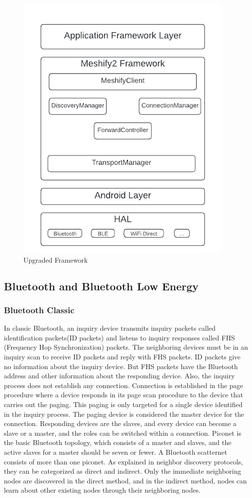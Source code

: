\begin{figure}[htbp]
    \centerline{\includegraphics[height=0.45\textwidth]{imgs/classArch.png}}
    \caption{Upgraded Framework}
    \label{figArch}
\end{figure}

\subsection{Bluetooth and Bluetooth Low Energy}

\subsubsection{Bluetooth Classic}

In classic Bluetooth, an inquiry device transmits inquiry packets called
identification packets(ID packets) and listens to inquiry responses called FHS
(Frequency Hop Synchronization) packets. The neighboring devices must be in an
inquiry scan to receive ID packets and reply with FHS packets. ID packets give
no information about the inquiry device. But FHS packets have the Bluetooth
address and other information about the responding device. Also, the inquiry
process does not establish any connection. Connection is established in the
page procedure where a device responds in its page scan procedure to the device
that carries out the paging. This paging is only targeted for a single device
identified in the inquiry process. The paging device is considered the master
device for the connection. Responding devices are the slaves, and every device
can become a slave or a master, and the roles can be switched within a
connection. Piconet is the basic Bluetooth topology, which consists of a master
and slaves, and the active slaves for a master should be seven or fewer. A
Bluetooth scatternet consists of more than one piconet. As explained in
neighbor discovery protocols, they can be categorized as direct and indirect.
Only the immediate neighboring nodes are discovered in the direct method, and
in the indirect method, nodes can learn about other existing nodes through
their neighboring nodes\cite{todtenberg2019}.

